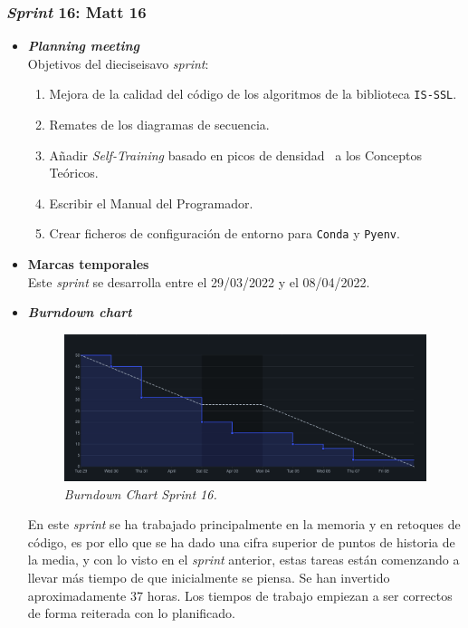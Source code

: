 \subsubsection{\textit{Sprint} 16: Matt 16}
\begin{itemize}
\item \textbf{\textit{Planning meeting}}\\
Objetivos del dieciseisavo \textit{sprint}:
\begin{enumerate}
\item Mejora de la calidad del código de los algoritmos de la biblioteca \texttt{IS-SSL}.
\item Remates de los diagramas de secuencia.
\item Añadir \textit{Self-Training} basado en picos de densidad~\cite{WU2018180} a los Conceptos Teóricos.
\item Escribir el Manual del Programador.
\item Crear ficheros de configuración de entorno para \texttt{Conda} y \texttt{Pyenv}.
\end{enumerate}

\item \textbf{Marcas temporales}\\
Este \textit{sprint} se desarrolla entre el 29/03/2022 y el 08/04/2022.

\item \textbf{\textit{Burndown chart}}\\
\begin{figure}
\begin{center}
\includegraphics[width=\textwidth]{../img/anexos/sprints/BD-Sprint16}
\caption{\textit{Burndown Chart Sprint 16.}}\label{fig:BD-Sprint16}
\end{center}
\end{figure}
En este \textit{sprint} se ha trabajado principalmente en la memoria y en retoques de código, es por ello que se ha dado una cifra superior de puntos de historia de la media, y con lo visto en el \textit{sprint} anterior, estas tareas están comenzando a llevar más tiempo de que inicialmente se piensa. Se han invertido aproximadamente 37 horas. Los tiempos de trabajo empiezan a ser correctos de forma reiterada con lo planificado.


\end{itemize}
